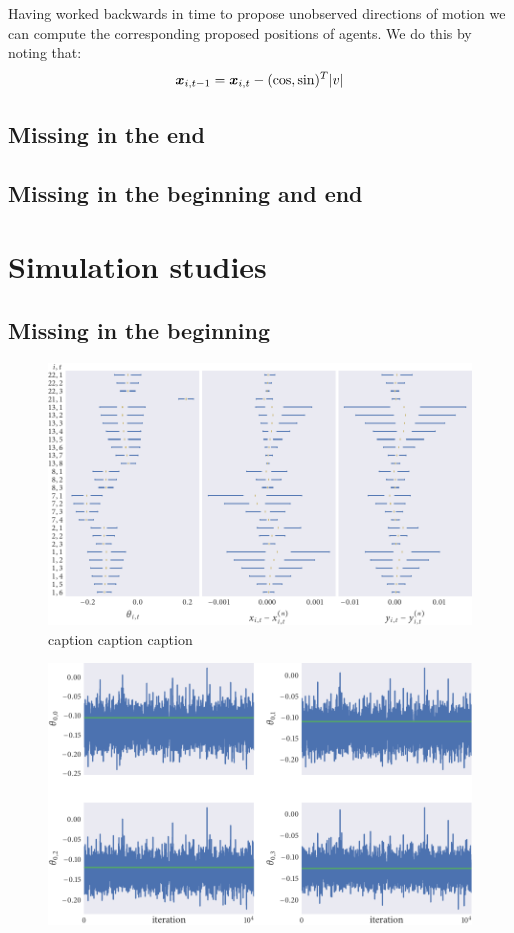 Having worked backwards in time to propose unobserved directions of motion we
can compute the corresponding proposed positions of agents. We do this by
noting that:
\begin{equation}
    \bm{x}_{i,t-1} = \bm{x}_{i, t} - (\cos, \sin)^T \abs{v}
\end{equation}


\subsection{Missing in the end}

\subsection{Missing in the beginning and end}

\section{Simulation studies}

\subsection{Missing in the beginning}

\begin{figure}[tbp]
  \includegraphics{beg/summary.pdf}
  \caption{caption caption caption}
  \label{fig:beg_summary}
\end{figure}

\begin{figure}[tbp]
  \includegraphics{beg/dir_trace.pdf}
  \caption{}
  \label{fig:beg_dir_trace}
\end{figure}

